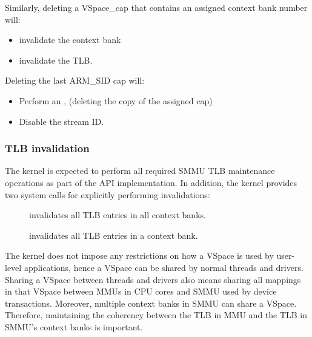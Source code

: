 Similarly, deleting a VSpace\_cap that contains an assigned context bank number will:
\begin{itemize}
    \item invalidate the context bank
    \item invalidate the TLB.
\end{itemize}

Deleting the last ARM\_SID cap will:
\begin{itemize}
    \item Perform an ,
        (deleting the copy of the assigned  cap)
    \item Disable the stream ID.
\end{itemize}

\subsubsection{TLB invalidation}
\label{sec:smmuv2-tlb-invalidation}
The kernel is expected to perform all required SMMU TLB maintenance operations
as part of the API implementation.  In addition, the kernel provides two system
calls for explicitly performing invalidations:
\begin{description}
    \item[]
        invalidates all TLB entries in all
    context banks.
    \item[]
        invalidates all TLB entries in a context bank.
\end{description}

The kernel does not impose any restrictions on how a VSpace is used by user-level
applications, hence a VSpace can be shared by normal threads and drivers. Sharing
a VSpace between threads and drivers also means sharing all mappings in that
VSpace between MMUs in CPU cores and SMMU used by device transactions. Moreover,
multiple context banks in SMMU can share a VSpace. Therefore, maintaining the
coherency between the TLB in MMU and the TLB in SMMU's context banks is important.

